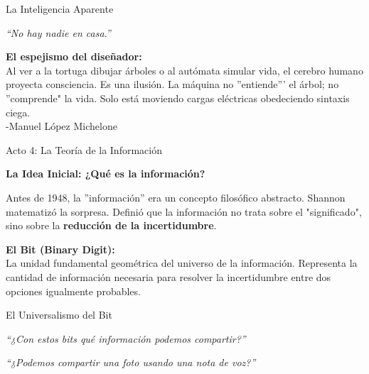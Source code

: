 \documentclass[10pt, aspectratio=169]{beamer}
\begin{document}
\begin{frame}{La Inteligencia Aparente}
    \vspace{0.8cm}
    \begin{center}
        \huge \textit{``No hay nadie en casa.''}
    \end{center}
    
    \vspace{0.8cm}
    \normalsize
    \alert{\textbf{El espejismo del diseñador:}} \\
    Al ver a la tortuga dibujar árboles o al autómata simular vida, el cerebro humano proyecta consciencia. Es una ilusión. La máquina no ''entiende''' el árbol; no ''comprende" la vida. Solo está moviendo cargas eléctricas obedeciendo sintaxis ciega. \\ -Manuel López Michelone
\end{frame}


\begin{frame}{Acto 4: La Teoría de la Información}
    \vspace{0.6cm}
    \begin{center}
        \Large \textbf{La Idea Inicial: ¿Qué es la información?}
        
        \vspace{0.8cm}
        \normalsize
        Antes de 1948, la ''información'' era un concepto filosófico abstracto. Shannon matematizó la sorpresa. Definió que la información no trata sobre el "significado", sino sobre la \textbf{reducción de la incertidumbre}.
        
        \vspace{0.6cm}
        \alert{\textbf{El Bit (Binary Digit):}} \\
        La unidad fundamental geométrica del universo de la información. Representa la cantidad de información necesaria para resolver la incertidumbre entre dos opciones igualmente probables.
    \end{center}
\end{frame}

\begin{frame}{El Universalismo del Bit}
    \vspace{0.8cm}
    \begin{center}
        \huge \textit{``¿Con estos bits qué información podemos compartir?''}
        
        \vspace{0.8cm}
        \huge \alert{\textit{``¿Podemos compartir una foto usando una nota de voz?''}}
    \end{center}
    
\end{frame}
\end{document}
